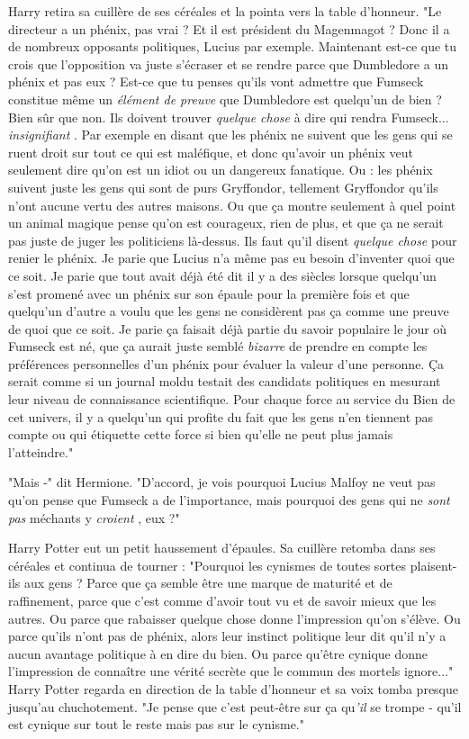 Harry retira sa cuillère de ses céréales et la pointa vers la table d'honneur. "Le directeur a un phénix, pas vrai ? Et il est président du Magenmagot ? Donc il a de nombreux opposants politiques, Lucius par exemple. Maintenant est-ce que tu crois que l'opposition va juste s'écraser et se rendre parce que Dumbledore a un phénix et pas eux ? Est-ce que tu penses qu'ils vont admettre que Fumseck constitue même un \emph{élément de preuve } que Dumbledore est quelqu'un de bien ? Bien sûr que non. Ils doivent trouver \emph{quelque chose}  à dire qui rendra Fumseck... \emph{insignifiant} . Par exemple en disant que les phénix ne suivent que les gens qui se ruent droit sur tout ce qui est maléfique, et donc qu'avoir un phénix veut seulement dire qu'on est un idiot ou un dangereux fanatique. Ou : les phénix suivent juste les gens qui sont de purs Gryffondor, tellement Gryffondor qu'ils n'ont aucune vertu des autres maisons. Ou que ça montre seulement à quel point un animal magique pense qu'on est courageux, rien de plus, et que ça ne serait pas juste de juger les politiciens là-dessus. Ils faut qu'il disent \emph{quelque chose}  pour renier le phénix. Je parie que Lucius n'a même pas eu besoin d'inventer quoi que ce soit. Je parie que tout avait déjà été dit il y a des siècles lorsque quelqu'un s'est promené avec un phénix sur son épaule pour la première fois et que quelqu'un d'autre a voulu que les gens ne considèrent pas ça comme une preuve de quoi que ce soit. Je parie ça faisait déjà partie du savoir populaire le jour où Fumseck est né, que ça aurait juste semblé \emph{bizarre}  de prendre en compte les préférences personnelles d'un phénix pour évaluer la valeur d'une personne. Ça serait comme si un journal moldu testait des candidats politiques en mesurant leur niveau de connaissance scientifique. Pour chaque force au service du Bien de cet univers, il y a quelqu'un qui profite du fait que les gens n'en tiennent pas compte ou qui étiquette cette force si bien qu'elle ne peut plus jamais l'atteindre."

"Mais -" dit Hermione. "D'accord, je vois pourquoi Lucius Malfoy ne veut pas qu'on pense que Fumseck a de l'importance, mais pourquoi des gens qui ne \emph{sont pas}  méchants y \emph{croient} , eux ?"

Harry Potter eut un petit haussement d'épaules. Sa cuillère retomba dans ses céréales et continua de tourner : "Pourquoi les cynismes de toutes sortes plaisent-ils aux gens ? Parce que ça semble être une marque de maturité et de raffinement, parce que c'est comme d'avoir tout vu et de savoir mieux que les autres. Ou parce que rabaisser quelque chose donne l'impression qu'on s'élève. Ou parce qu'ils n'ont pas de phénix, alors leur instinct politique leur dit qu'il n'y a aucun avantage politique à en dire du bien. Ou parce qu'être cynique donne l'impression de connaître une vérité secrète que le commun des mortels ignore..." Harry Potter regarda en direction de la table d'honneur et sa voix tomba presque jusqu'au chuchotement. "Je pense que c'est peut-être sur ça qu\emph{'il}  se trompe - qu'il est cynique sur tout le reste mais pas sur le cynisme."

